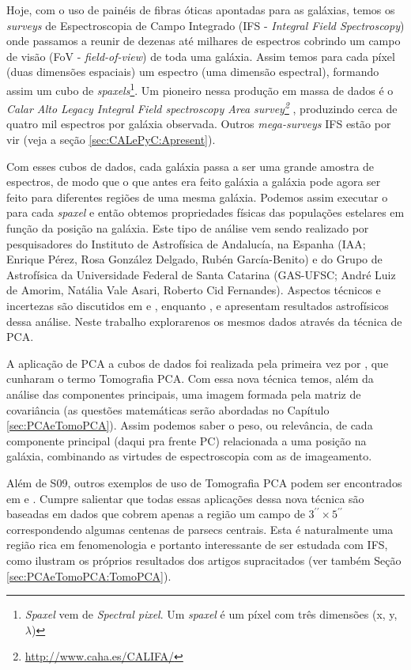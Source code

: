 Hoje, com o uso de painéis de fibras óticas apontadas para as galáxias, temos os {\em surveys} de Espectroscopia de
Campo Integrado (IFS - {\em Integral Field Spectroscopy}) onde passamos a reunir de dezenas até milhares de espectros
cobrindo um campo de visão (FoV - {\em field-of-view}) de toda uma galáxia. Assim temos para cada píxel (duas dimensões
espaciais) um espectro (uma dimensão espectral), formando assim um cubo de {\em spaxels}\footnote{{\em Spaxel} vem de
{\em Spectral pixel}. Um {\em spaxel} é um píxel com três dimensões (x, y, $\lambda$)}. Um pioneiro nessa produção em
massa de dados é o {\em Calar Alto Legacy Integral Field spectroscopy Area
survey\footnote{\url{http://www.caha.es/CALIFA/}}} \citep[CALIFA; ][]{CALIFAPresent2012}, produzindo cerca de quatro mil
espectros por galáxia observada. Outros {\em mega-surveys} IFS estão por vir (veja a seção \ref{sec:CALePyC:Apresent}).

Com esses cubos de dados, cada galáxia passa a ser uma grande amostra de espectros, de modo que o que antes era feito
galáxia a galáxia pode agora ser feito para diferentes regiões de uma mesma galáxia. Podemos assim executar o \starlight
para cada {\em spaxel} e então obtemos propriedades físicas das populações estelares em função da posição na galáxia.
Este tipo de análise vem sendo realizado por pesquisadores do Instituto de Astrofísica de Andalucía, na Espanha (IAA;
Enrique Pérez, Rosa González Delgado, Rubén García-Benito) e do Grupo de Astrofísica da Universidade Federal de Santa
Catarina (GAS-UFSC; André Luiz de Amorim, Natália Vale Asari, Roberto Cid Fernandes). Aspectos técnicos e incertezas são
discutidos em \citet[][CF13 daqui pra frente]{CidFernandes2013} e \citet{CidFernandes2014}, enquanto \citet{Perez2013},
e \citet{GonzalezDelgado2014} apresentam resultados astrofísicos dessa análise. Neste trabalho explorarenos os mesmos
dados através da técnica de PCA.

A aplicação de PCA a cubos de dados foi realizada pela primeira vez por \citet[][S09 daqui pra frente]{Steiner2009}, que
cunharam o termo Tomografia PCA. Com essa nova técnica temos, além da análise das componentes principais, uma imagem
formada pela matriz de covariância (as questões matemáticas serão abordadas no Capítulo \ref{sec:PCAeTomoPCA}). Assim
podemos saber o peso, ou relevância, de cada componente principal (daqui pra frente PC) relacionada a uma posição na
galáxia, combinando as virtudes de espectroscopia com as de imageamento.

Além de S09, outros exemplos de uso de Tomografia PCA podem ser encontrados em \citet{Riffel2011} e \citet{Ricci2011}.
Cumpre salientar que todas essas aplicações dessa nova técnica são baseadas em dados que cobrem apenas a região um campo
de $3^{\prime\prime} \times 5^{\prime\prime}$ correspondendo algumas centenas de parsecs centrais. Esta é naturalmente
uma região rica em fenomenologia e portanto interessante de ser estudada com IFS, como ilustram os próprios resultados
dos artigos supracitados (ver também Seção \ref{sec:PCAeTomoPCA:TomoPCA}).

